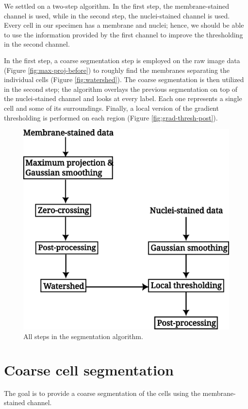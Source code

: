 \documentclass[
  digital,     %
  oneside,     %
  nosansbold,  %
  nocolorbold, %
  lof,         %
  lot,         %
]{fithesis4}
\begin{document}
We settled on a two-step algorithm. In the first step, the membrane-stained
channel is used, while in the second step, the nuclei-stained channel is used.
Every cell in our specimen has a membrane and nuclei; hence, we should be able
to use the information provided by the first channel to improve the thresholding
in the second channel.

In the first step, a coarse segmentation step is employed on the raw image data (Figure \ref{fig:max-proj-before}) to roughly find the membranes separating the individual cells (Figure \ref{fig:watershed}). The coarse segmentation is then utilized in the second step; the algorithm overlays the previous
segmentation on top of the nuclei-stained channel and looks at every label.
Each one represents a single cell and some of its surroundings. Finally, a
local version of the gradient thresholding is performed on each region (Figure \ref{fig:grad-thresh-post}).
\begin{figure}
    \begin{center}
        \includegraphics[width=0.8\linewidth]{./resources/inkscape/segmentation-steps.png}
    \end{center}
    \caption{All steps in the segmentation algorithm.}
    \label{fig:segmentation_steps}
\end{figure}

\section{Coarse cell segmentation}
The goal is to provide a coarse segmentation of the cells using the
membrane-stained channel.
\end{document}
